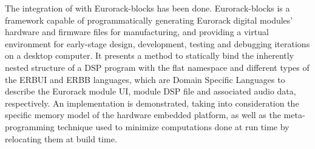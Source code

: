 The integration of \F{} with Eurorack-blocks has been done. Eurorack-blocks is a framework capable of programmatically
generating Eurorack digital modules' hardware and firmware files for manufacturing, and providing a virtual environment
for early-stage design, development, testing and debugging iterations on a desktop computer. It presents a method to
statically bind the inherently nested structure of a \F{} DSP program with the flat namespace and different types of the
ERBUI and ERBB languages, which are Domain Specific Languages to describe the Eurorack module UI, module DSP file and
associated audio data, respectively. An implementation is demonstrated, taking into consideration the specific memory
model of the hardware embedded platform, as well as the meta-programming technique used to minimize computations done at
run time by relocating them at build time.
